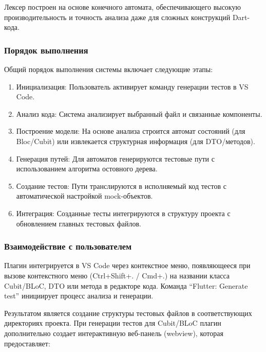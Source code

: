 \documentclass[14pt, russian]{scrartcl}
\newcommand{\enq}[1]{\enquote{#1}}
\begin{document}
Лексер построен на основе конечного автомата, обеспечивающего высокую производительность и точность анализа даже для сложных конструкций Dart-кода.

\subsubsection{Порядок выполнения}

Общий порядок выполнения системы включает следующие этапы:

\begin{enumerate}
    \item Инициализация: Пользователь активирует команду генерации тестов в VS Code.
    \item Анализ кода: Система анализирует выбранный файл и связанные компоненты.
    \item Построение модели: На основе анализа строится автомат состояний (для Bloc/Cubit) или извлекается структурная информация (для DTO/методов).
    \item Генерация путей: Для автоматов генерируются тестовые пути с использованием алгоритма остовного дерева.
    \item Создание тестов: Пути транслируются в исполняемый код тестов с автоматической настройкой mock-объектов.
    \item Интеграция: Созданные тесты интегрируются в структуру проекта с обновлением главных тестовых файлов.
\end{enumerate}

\subsubsection{Взаимодействие с пользователем}
Плагин интегрируется в VS Code через контекстное меню, появляющееся при вызове контекстного меню (Ctrl+Shift+. / Cmd+.) на названии класса Cubit/BLoC, DTO или метода в редакторе кода. Команда \enq{Flutter: Generate test} инициирует процесс анализа и генерации. 

Результатом является создание структуры тестовых файлов в соответствующих директориях проекта. При генерации тестов для Cubit/BLoC плагин дополнительно создает интерактивную веб-панель (webview), которая предоставляет:
\end{document}
